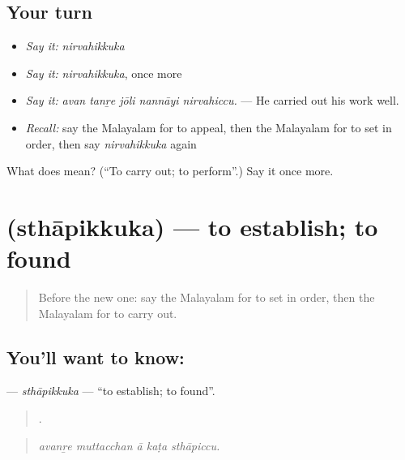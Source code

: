 \subsection*{Your turn}
\begin{itemize}
\raggedright
  \item \emph{Say it:} \emph{nirvahikkuka}
  \item \emph{Say it:} \emph{nirvahikkuka}, once more
  \item \emph{Say it:} \emph{avan tanṟe jōli nannāyi nirvahiccu.} — He carried out his work well.
  \item \emph{Recall:} say the Malayalam for to appeal, then the Malayalam for to set in order, then say \emph{nirvahikkuka} again
\end{itemize}

\begin{tcolorbox}[breakable,colback=teal!4,colframe=teal!35!black,title={Before you move on}]
What does  mean? (\textquotedblleft{}To carry out; to perform\textquotedblright{}.) Say it once more.
\end{tcolorbox}
\section[\texorpdfstring{\ml{സ്ഥാപിക്കുക} (sthāpikkuka)}{സ്ഥാപിക്കുക (sthāpikkuka)}]{ (sthāpikkuka) — to establish; to found}

\label{lesson:ML-C457-sthapikkuka}



\begin{quote}
Before the new one: say the Malayalam for to set in order, then the Malayalam for to carry out.
\end{quote}

\subsection*{You'll want to know: }
\textbf{} — \emph{sthāpikkuka} — \textquotedblleft{}to establish; to found\textquotedblright{}.

\begin{quote}
    .
\end{quote}

\begin{quote}
\emph{avanṟe muttacchan ā kaṭa sthāpiccu.}
\end{quote}

